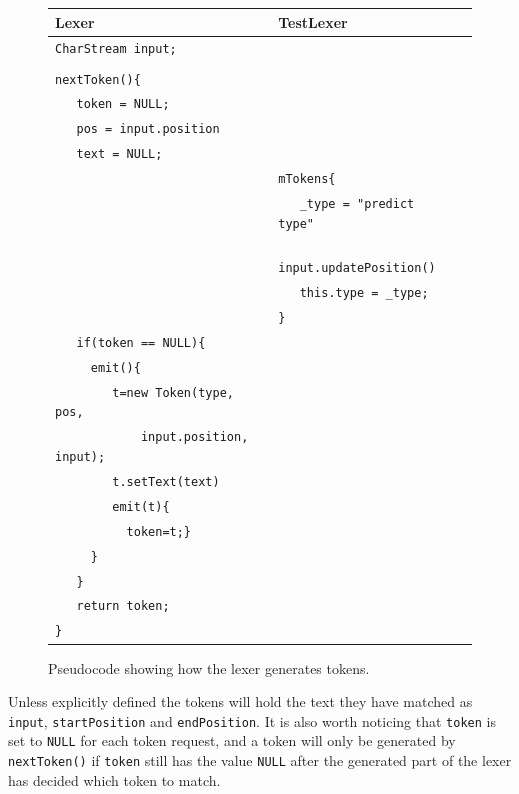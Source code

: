 \begin{figure}[h]
\centering
\begin{tabular}{|l|l|l|} \hline
\textbf{Lexer} 				& \textbf{TestLexer} 			\\ \hline
\verb!CharStream input;!		& 					\\
					&					\\
\verb!nextToken(){!			&					\\
\verb!   token = NULL;!			&					\\
\verb!   pos = input.position!		&					\\
\verb!   text = NULL;!			&					\\
					& \verb!mTokens{!			\\ 
					& \verb!   _type = "predict type"!	\\
					& \verb!   input.updatePosition()!	\\
					& \verb!   this.type = _type;!		\\
					& \verb!}!				\\
\verb!   if(token == NULL){!		&					\\
\verb!     emit(){!			&					\\
\verb!        t=new Token(type, pos,! 	&					\\
\verb!            input.position, input);!&					\\ 
\verb!        t.setText(text)!		&					\\
\verb!        emit(t){!			&					\\
\verb!          token=t;}!		&					\\
\verb!     }!				&					\\
\verb!   }!				&					\\
\verb!   return token;!			&					\\
\verb!}!				&					\\ \hline
\end{tabular}
\caption{Pseudocode showing how the lexer generates tokens.}
\label{fig:nextToken}
\end{figure}
Unless explicitly defined the tokens will hold the text they have matched as \verb!input!, \verb!startPosition! and \verb!endPosition!. It is also worth noticing that \verb!token! is set to \verb!NULL! for each token request, and a token will only be generated by \verb!nextToken()! if \verb!token! still has the value \verb!NULL! after the generated part of the lexer has decided which token to match.

